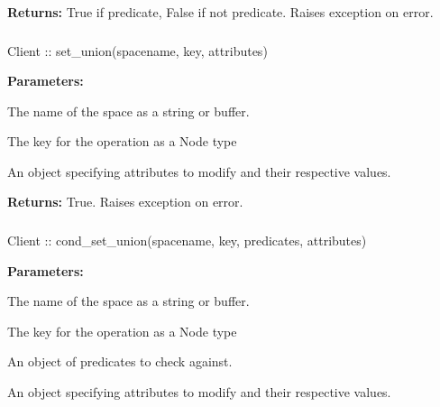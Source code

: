 \noindent\textbf{Returns:}
True if predicate, False if not predicate.  Raises exception on error.

\subsubsection{}
\label{api:nodejs:set_union}
\begin{javascriptcode}
Client :: set_union(spacename, key, attributes)
\end{javascriptcode}


\noindent\textbf{Parameters:}
\begin{description}[labelindent=\widthof{{\code{attributes}}},leftmargin=*,noitemsep,nolistsep,align=right]
\item[\code{spacename}] The name of the space as a string or buffer.
\item[\code{key}] The key for the operation as a Node type
\item[\code{attributes}] An object specifying attributes to modify and their respective values.
\end{description}

\noindent\textbf{Returns:}
True.  Raises exception on error.

\subsubsection{}
\label{api:nodejs:cond_set_union}
\begin{javascriptcode}
Client :: cond_set_union(spacename, key, predicates, attributes)
\end{javascriptcode}


\noindent\textbf{Parameters:}
\begin{description}[labelindent=\widthof{{\code{predicates}}},leftmargin=*,noitemsep,nolistsep,align=right]
\item[\code{spacename}] The name of the space as a string or buffer.
\item[\code{key}] The key for the operation as a Node type
\item[\code{predicates}] An object of predicates to check against.
\item[\code{attributes}] An object specifying attributes to modify and their respective values.
\end{description}

